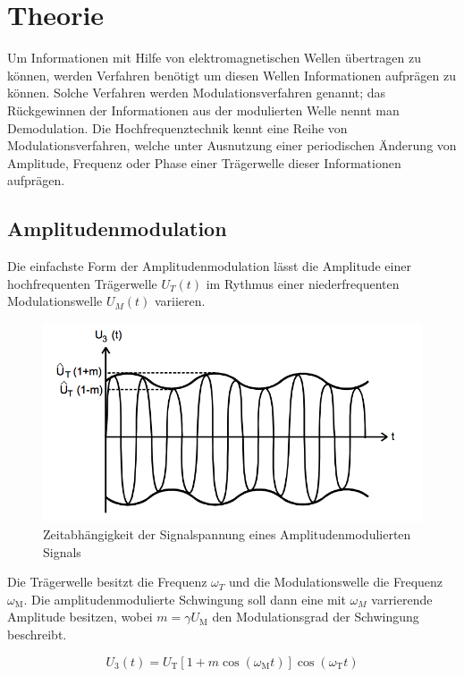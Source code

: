 \section{Theorie}
Um Informationen mit Hilfe von elektromagnetischen Wellen übertragen zu können, werden Verfahren benötigt um diesen Wellen Informationen aufprägen zu können. Solche Verfahren werden Modulationsverfahren genannt; das Rückgewinnen der Informationen aus der modulierten Welle nennt man Demodulation.
Die Hochfrequenztechnik kennt eine Reihe von Modulationsverfahren, welche unter Ausnutzung einer periodischen Änderung von Amplitude, Frequenz oder Phase einer Trägerwelle dieser Informationen aufprägen.

\subsection{Amplitudenmodulation}
Die einfachste Form der Amplitudenmodulation lässt die Amplitude einer hochfrequenten Trägerwelle $U_T(t)$ im Rythmus einer niederfrequenten Modulationswelle $U_M(t)$ variieren.

\begin{figure}[h]
	\centering
	\includegraphics[width=\textwidth]{img/Abb1.png}
	\caption{Zeitabhängigkeit der Signalspannung eines Amplitudenmodulierten Signals \cite{FP}}
\end{figure}

\noindent Die Trägerwelle besitzt die Frequenz $\omega_T$ und die Modulationswelle die Frequenz $\omega_\text{M}$. Die amplitudenmodulierte Schwingung soll dann eine mit $\omega_M$ varrierende Amplitude
besitzen, wobei $m = \gamma U_\text{M}$ den  Modulationsgrad der Schwingung beschreibt.

\begin{equation}
U_{3}(t) = U_\text{T} \left[1 + m \cos( \omega_\text{M} t)\right]\cos(\omega_\text{T} t)
\label{eq:AmMod}
\end{equation}

